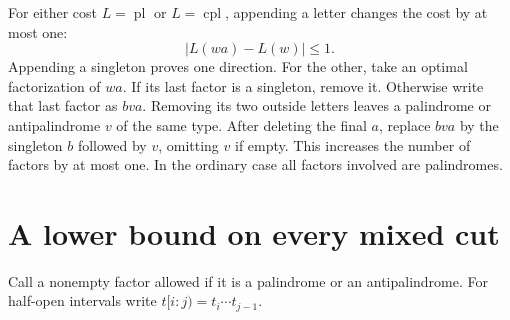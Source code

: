 \documentclass[11pt]{article}
\newcommand{\pl}{\operatorname{pl}}
\newcommand{\cl}{\operatorname{cpl}}
\begin{document}
For either cost $L=\pl$ or $L=\cl$, appending a letter changes the cost
by at most one:
\begin{equation}\label{eq:lip}
 |L(wa)-L(w)|\leq1.
\end{equation}
Appending a singleton proves one direction. For the other, take an optimal
factorization of $wa$. If its last factor is a singleton, remove it.
Otherwise write that last factor as $bva$. Removing its two outside
letters leaves a palindrome or antipalindrome $v$ of the same type.
After deleting the final $a$, replace $bva$ by the singleton $b$ followed
by $v$, omitting $v$ if empty. This increases the number of factors by
at most one. In the ordinary case all factors involved are palindromes.

\section{A lower bound on every mixed cut}
Call a nonempty factor allowed if it is a palindrome or an antipalindrome.
For half-open intervals write $t[i:j)=t_i\cdots t_{j-1}$.
\end{document}
